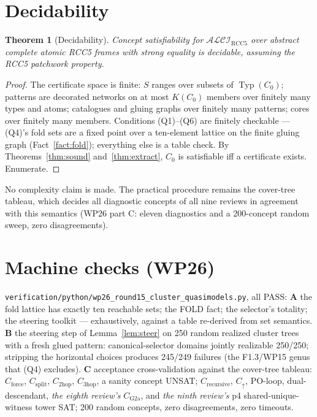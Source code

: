 \documentclass[11pt]{article}
\newtheorem{theorem}{Theorem}[section]
\theoremstyle{definition}
\newcommand{\ALCIRCC}{\mathcal{ALCI}_{\mathrm{RCC5}}}
\newcommand{\Typ}{\operatorname{Typ}}
\newcommand{\code}[1]{\texttt{#1}}
\begin{document}
\section{Decidability}\label{sec:dec}

\begin{theorem}[Decidability]\label{thm:dec}
Concept satisfiability for $\ALCIRCC$ over abstract complete atomic
RCC5 frames with strong equality is decidable, assuming the RCC5
patchwork property.
\end{theorem}

\begin{proof}
The certificate space is finite: $S$ ranges over subsets of
$\Typ(C_0)$; patterns are decorated networks on at most $K(C_0)$
members over finitely many types and atoms; catalogues and gluing
graphs over finitely many patterns; cores over finitely many members.
Conditions (Q1)--(Q6) are finitely checkable --- (Q4)'s fold sets are a
fixed point over a ten-element lattice on the finite gluing graph
(Fact~\ref{fact:fold}); everything else is a table check.  By
Theorems~\ref{thm:sound} and~\ref{thm:extract}, $C_0$ is satisfiable
iff a certificate exists.  Enumerate.
\end{proof}

No complexity claim is made.  The practical procedure remains the
cover-tree tableau, which decides all diagnostic concepts of all nine
reviews in agreement with this semantics (WP26 part C: eleven
diagnostics and a 200-concept random sweep, zero disagreements).

\section{Machine checks (WP26)}\label{sec:wp}

\code{verification/python/wp26\_round15\_cluster\_quasimodels.py}, all
PASS: \textbf{A} the fold lattice has exactly ten reachable sets; the
FOLD fact; the selector's totality; the steering toolkit ---
exhaustively, against a table re-derived from set semantics.
\textbf{B} the steering step of Lemma~\ref{lem:steer} on 250 random
realized cluster trees with a fresh glued pattern: canonical-selector
domains jointly realizable 250/250; stripping the horizontal choices
produces 245/249 failures (the F1.3/WP15 genus that (Q4) excludes).
\textbf{C} acceptance cross-validation against the cover-tree tableau:
$C_{\mathrm{force}}$, $C_{\mathrm{split}}$, $C_{\mathrm{2hop}}$,
$C_{\mathrm{3hop}}$, a sanity concept UNSAT; $C_{\mathrm{recursive}}$,
$C_\uparrow$, PO-loop, dual-descendant,
\emph{the eighth review's} $C_{\mathrm{G2a}}$, and \emph{the ninth
review's} p4 shared-unique-witness tower SAT; 200 random concepts,
zero disagreements, zero timeouts.
\end{document}
